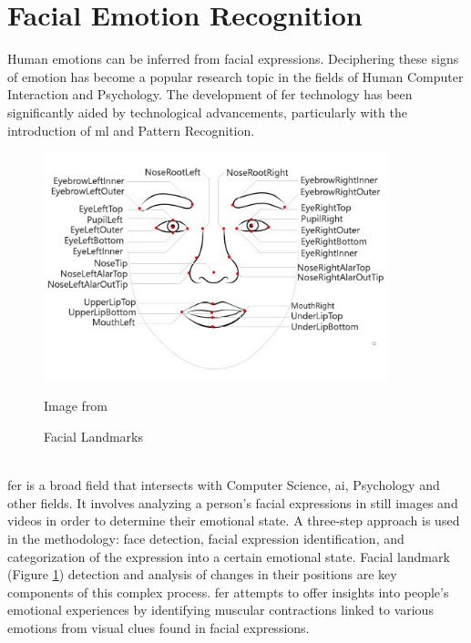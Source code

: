 \section{Facial Emotion Recognition}
Human emotions can be inferred from facial expressions. 
Deciphering these signs of emotion has become a popular research topic in the fields of Human Computer Interaction and Psychology. \citep{vemou_2021_facial}
The development of \gls{fer} technology has been significantly aided by technological advancements, particularly with the introduction of \gls{ml} and Pattern Recognition.
\\
\begin{figure}[!ht]
    \centering
    \includegraphics[width=10cm]{Images/landmarks.jpg}
    \caption{Facial Landmarks} \footnotesize{Image from \citep{patrickfarley_2023_face}}
    \label{fig:facial_landmark}
\end{figure}
\\
\indent \gls{fer} is a broad field that intersects with Computer Science, \gls{ai}, Psychology and other fields. 
It involves analyzing a person's facial expressions in still images and videos in order to determine their emotional state. 
A three-step approach is used in the methodology: face detection, facial expression identification, and categorization of the expression into a certain emotional state. 
Facial landmark (Figure \ref{fig:facial_landmark}) detection and analysis of changes in their positions are key components of this complex process. 
\gls{fer} attempts to offer insights into people's emotional experiences by identifying muscular contractions linked to various emotions from visual clues found in facial expressions.
\\
